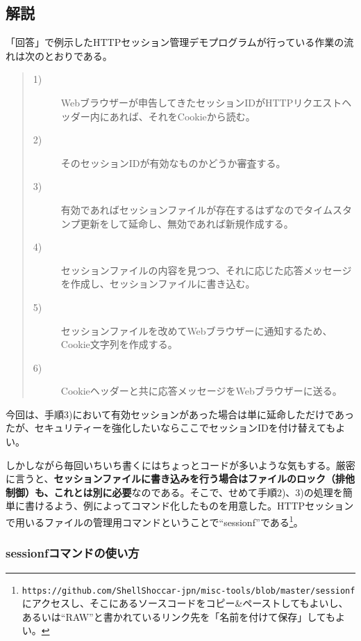 \subsection*{解説}

「回答」で例示したHTTPセッション管理デモプログラムが行っている作業の流れは次のとおりである。
\begin{quote}
\begin{description}
  \item[1)] Webブラウザーが申告してきたセッションIDがHTTPリクエストヘッダー内にあれば、それをCookieから読む。
  \item[2)] そのセッションIDが有効なものかどうか審査する。
  \item[3)] 有効であればセッションファイルが存在するはずなのでタイムスタンプ更新をして延命し、無効であれば新規作成する。
  \item[4)] セッションファイルの内容を見つつ、それに応じた応答メッセージを作成し、セッションファイルに書き込む。
  \item[5)] セッションファイルを改めてWebブラウザーに通知するため、Cookie文字列を作成する。
  \item[6)] Cookieヘッダーと共に応答メッセージをWebブラウザーに送る。
\end{description}
\end{quote}

今回は、手順3)において有効セッションがあった場合は単に延命しただけであったが、セキュリティーを強化したいならここでセッションIDを付け替えてもよい。

しかしながら毎回いちいち書くにはちょっとコードが多いような気もする。厳密に言うと、\textbf{セッションファイルに書き込みを行う場合はファイルのロック（排他制御）も、これとは別に必要}なのである。そこで、せめて手順2)、3)の処理を簡単に書けるよう、例によってコマンド化したものを用意した。HTTPセッションで用いるファイルの管理用コマンドということで``sessionf''である\footnote{\verb|https://github.com/ShellShoccar-jpn/misc-tools/blob/master/sessionf|にアクセスし、そこにあるソースコードをコピー\&{}ペーストしてもよいし、あるいは``RAW''と書かれているリンク先を「名前を付けて保存」してもよい。}。

\subsubsection*{sessionfコマンドの使い方}

